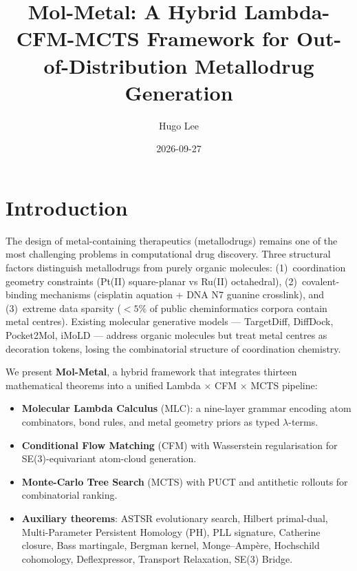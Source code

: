 \documentclass[10pt]{article}
\title{Mol-Metal: A Hybrid Lambda-CFM-MCTS Framework for
       Out-of-Distribution Metallodrug Generation}
\author{Hugo Lee}
\date{2026-09-27}
\begin{document}
\maketitle

\section{Introduction}
\label{sec:intro}

The design of metal-containing therapeutics (metallodrugs) remains one of the
most challenging problems in computational drug discovery.  Three structural
factors distinguish metallodrugs from purely organic molecules:
(1)~coordination geometry constraints (Pt(II) square-planar vs Ru(II)
octahedral), (2)~covalent-binding mechanisms (cisplatin aquation + DNA N7
guanine crosslink), and (3)~extreme data sparsity ($<5\%$ of public
cheminformatics corpora contain metal centres).  Existing molecular
generative models --- TargetDiff, DiffDock, Pocket2Mol, iMoLD --- address
organic molecules but treat metal centres as decoration tokens, losing the
combinatorial structure of coordination chemistry.

We present \textbf{Mol-Metal}, a hybrid framework that integrates
thirteen mathematical theorems into a unified Lambda $\times$ CFM
$\times$ MCTS pipeline:

\begin{itemize}
  \item \textbf{Molecular Lambda Calculus} (MLC): a nine-layer grammar
        encoding atom combinators, bond rules, and metal geometry priors
        as typed $\lambda$-terms.
  \item \textbf{Conditional Flow Matching} (CFM) with Wasserstein
        regularisation for SE(3)-equivariant atom-cloud generation.
  \item \textbf{Monte-Carlo Tree Search} (MCTS) with PUCT and
        antithetic rollouts for combinatorial ranking.
  \item \textbf{Auxiliary theorems}: ASTSR evolutionary search, Hilbert
        primal-dual, Multi-Parameter Persistent Homology (PH), PLL
        signature, Catherine closure, Bass martingale, Bergman kernel,
        Monge--Amp\`ere, Hochschild cohomology, Deflexpressor, Transport
        Relaxation, SE(3) Bridge.
\end{itemize}
\end{document}
